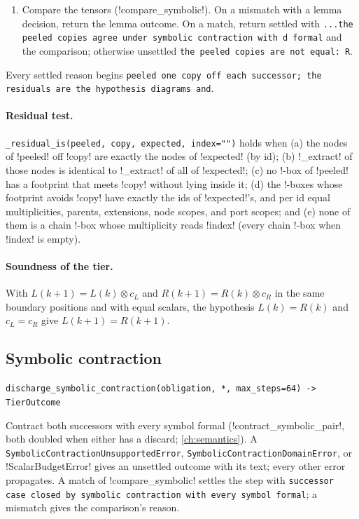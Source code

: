 \begin{algorithm}
\begin{enumerate}
\item Compare the tensors (\py!compare_symbolic!). On a mismatch with a lemma decision, return the lemma outcome. On a match, return settled with \texttt{.\allowbreak{}.\allowbreak{}.\allowbreak{}the peeled copies agree under symbolic contraction with d formal} and the comparison; otherwise unsettled \texttt{the peeled copies are not equal: R}.
\end{enumerate}
Every settled reason begins \texttt{peeled one copy off each successor; the residuals are the hypothesis diagrams and}.
\end{algorithm}

\paragraph{Residual test.} \texttt{\_\allowbreak{}residual\_\allowbreak{}is(\allowbreak{}peeled,\allowbreak{} copy,\allowbreak{} expected,\allowbreak{} index="")} holds when (a) the nodes of \code!peeled! off \code!copy! are exactly the nodes of \code!expected! (by id); (b) \py!_extract! of those nodes is identical to \py!_extract! of all of \code!expected!; (c) no !-box of \code!peeled! has a footprint that meets \code!copy! without lying inside it; (d) the !-boxes whose footprint avoids \code!copy! have exactly the ids of \code!expected!'s, and per id equal multiplicities, parents, extensions, node scopes, and port scopes; and (e) none of them is a chain !-box whose multiplicity reads \code!index! (every chain !-box when \code!index! is empty).

\paragraph{Soundness of the tier.} With $L(k+1)=L(k)\otimes c_L$ and $R(k+1)=R(k)\otimes c_R$ in the same boundary positions and with equal scalars, the hypothesis $L(k)=R(k)$ and $c_L=c_R$ give $L(k+1)=R(k+1)$.

\subsection{Symbolic contraction}\label{sec:kernel-tier-symbolic}

\begin{signature}
\texttt{discharge\_\allowbreak{}symbolic\_\allowbreak{}contraction(\allowbreak{}obligation,\allowbreak{} *,\allowbreak{} max\_\allowbreak{}steps=64) -> TierOutcome}

Contract both successors with every symbol formal (\py!contract_symbolic_pair!, both doubled when either has a discard; \cref{ch:semantics}). A \texttt{SymbolicContractionUnsupportedError}, \texttt{SymbolicContractionDomainError}, or \py!ScalarBudgetError! gives an unsettled outcome with its text; every other error propagates. A match of \py!compare_symbolic! settles the step with \texttt{successor case closed by symbolic contraction with every symbol formal}; a mismatch gives the comparison's reason.
\end{signature}

